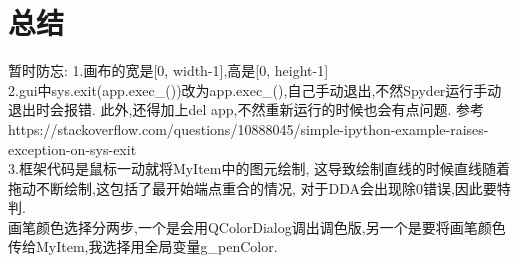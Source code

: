 \documentclass[a4paper,UTF8]{article}
\theoremstyle{definition}
\begin{document}
\section{总结}
暂时防忘:
\indent 1.画布的宽是[0, width-1],高是[0, height-1]\\

\indent 2.gui中sys.exit(app.exec\_())改为app.exec\_(),自己手动退出,不然Spyder运行手动退出时会报错.
此外,还得加上del app,不然重新运行的时候也会有点问题.
参考https://stackoverflow.com/questions/10888045/simple-ipython-example-raises-exception-on-sys-exit\\

\indent 3.框架代码是鼠标一动就将MyItem中的图元绘制,
这导致绘制直线的时候直线随着拖动不断绘制,这包括了最开始端点重合的情况,
对于DDA会出现除0错误,因此要特判.\\

\indent 画笔颜色选择分两步,一个是会用QColorDialog调出调色版,另一个是要将画笔颜色传给MyItem,我选择用全局变量g\_penColor.\\

%

\end{document}
